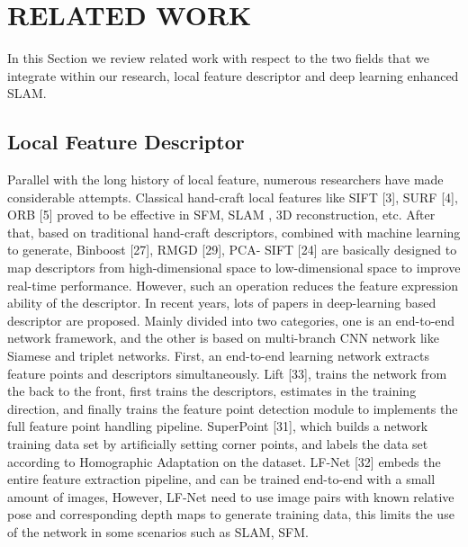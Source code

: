 \documentclass[letterpaper, 10 pt, conference]{ieeeconf}  %
\begin{document}
\section{RELATED WORK}
In this Section we review related work with respect to the two fields that we integrate within our research, local feature descriptor and deep learning enhanced SLAM.
\subsection{Local Feature Descriptor}
Parallel with the long history of local feature, numerous researchers have made considerable attempts. Classical hand-craft local features like SIFT [3], SURF [4], ORB [5] proved to be effective in SFM, SLAM , 3D reconstruction, etc. After that, based on traditional hand-craft descriptors, combined with machine learning to generate, Binboost [27], RMGD [29], PCA- SIFT [24] are basically designed to map descriptors from high-dimensional space to low-dimensional space to improve real-time performance. However, such an operation reduces the feature expression ability of the descriptor.
In recent years, lots of papers in deep-learning based descriptor are proposed. Mainly divided into two categories, one is an end-to-end network framework, and the other is based on multi-branch CNN network like Siamese and triplet networks.
First, an end-to-end learning network extracts feature points and descriptors simultaneously. Lift [33], trains the network from the back to the front, first trains the descriptors, estimates in the training direction, and finally trains the feature point detection module to implements the full feature point handling pipeline. SuperPoint [31], which builds a network training data set by artificially setting corner points, and labels the data set according to Homographic Adaptation on the dataset. LF-Net [32] embeds the entire feature extraction pipeline, and can be trained end-to-end with a small amount of images, However, LF-Net need to use image pairs with known relative pose and corresponding depth maps to generate training data, this limits the use of the network in some scenarios such as SLAM, SFM.
\end{document}
